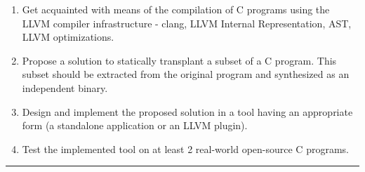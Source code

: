 \documentclass[12pt, twoside]{fithesis2}
\renewcommand{\_}{\leavevmode \kern0.07em\vbox{\hrule width0.4em}}
\newenvironment{myEnumerate}{
  \begin{enumerate}[
    leftmargin=2em,
    rightmargin=1em,
    itemsep=\parskip,
    parsep=0em,
    topsep=0em,
    partopsep=0em
]
}{
  \end{enumerate}
}
\begin{document}
\begin{myEnumerate}
\item Get acquainted with means of the compilation of C programs using the LLVM
compiler infrastructure - clang, LLVM Internal Representation, AST, LLVM
optimizations.
\item Propose a solution to statically transplant a subset of a C program. This
subset should be extracted from the original program and synthesized as an
independent binary.
\item Design and implement the proposed solution in a tool having an
appropriate form (a standalone application or an LLVM plugin).
\item Test the implemented tool on at least 2 real-world open-source C
programs.
\end{myEnumerate}

\noindent\rule{\textwidth}{1pt}
\end{document}
